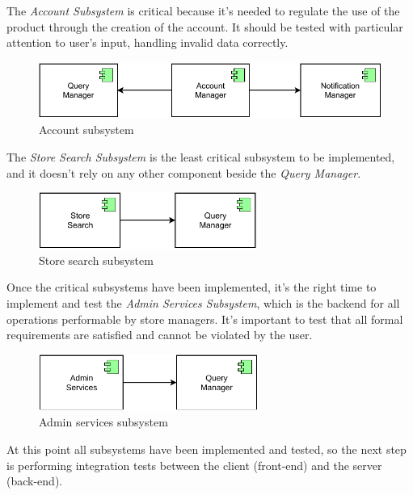 The \emph{Account Subsystem} is critical because it's needed to regulate the use of the product through the creation of the account. It should be tested with particular attention to user's input, handling invalid data correctly.

\begin{figure}[H]
    \centering
    \includegraphics[height=5em]{images/draw.io/account_subsystem.pdf}
    \caption{Account subsystem}
    \label{fig:account_subsystem}
\end{figure}

The \emph{Store Search Subsystem} is the least critical subsystem to be implemented, and it doesn't rely on any other component beside the \emph{Query Manager}.

\begin{figure}[H]
    \centering
    \includegraphics[height=5em]{images/draw.io/store_search_subsystem.pdf}
    \caption{Store search subsystem}
    \label{fig:store_search_subsystem}
\end{figure}


Once the critical subsystems have been implemented, it's the right time to implement and test the \emph{Admin Services Subsystem}, which is the backend for all operations performable by store managers. It's important to test that all formal requirements are satisfied and cannot be violated by the user.
\begin{figure}[H]
    \centering
    \includegraphics[height=5em]{images/draw.io/admin_services_subsystem.pdf}
    \caption{Admin services subsystem}
    \label{fig:admin_services_subsystem}
\end{figure}

At this point all subsystems have been implemented and tested, so the next step is performing integration tests between the client (front-end) and the server (back-end).

